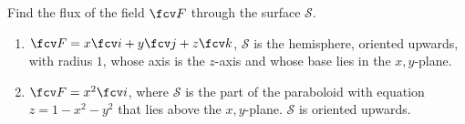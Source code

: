 Find the flux of the field $\fcv F$ through the surface $\mathcal S$.
\begin{enumerate}
\item $\fcv F=x\fcv i + y\fcv j + z\fcv k$, $\mathcal S$ is the hemisphere, oriented upwards, with radius $1$, whose axis is the $z$-axis and whose base lies in the $x,y$-plane.
\item $\fcv F=x^2 \fcv i$, where $\mathcal S$ is the part of the paraboloid with equation $z=1-x^2-y^2$ that lies above the $x,y$-plane. $\mathcal S$ is oriented upwards.
\end{enumerate}